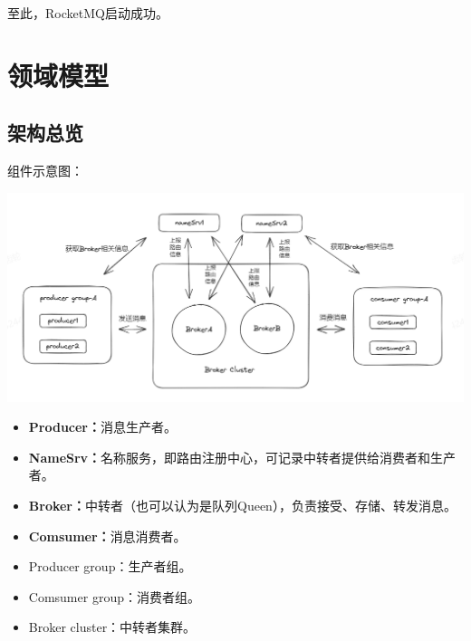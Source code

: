 \documentclass[11pt, a4paper, oneside]{ctexbook}
\let\kaishu\relax                               %
\begin{document}
至此，RocketMQ启动成功。

\chapter{领域模型}
\section{架构总览}
组件示意图：
\begin{center}
  \begin{minipage}{\textwidth}
    \center
    \includegraphics[width=\textwidth]{picture/RocketMQ全局图.jpg}
    \captionsetup{hypcap=false}
    \label{fig:RocketMQ全局图}
  \end{minipage}
\end{center}

\begin{itemize}
  \item {\bfseries\kaishu Producer：}消息生产者。
  \item {\bfseries\kaishu NameSrv：}名称服务，即路由注册中心，可记录中转者提供给消费者和生产者。
  \item {\bfseries\kaishu Broker：}中转者（也可以认为是队列Queen），负责接受、存储、转发消息。
  \item {\bfseries\kaishu Comsumer：}消息消费者。
  \item Producer group：生产者组。
  \item Comsumer group：消费者组。
  \item Broker cluster：中转者集群。
\end{itemize}
\end{document}
